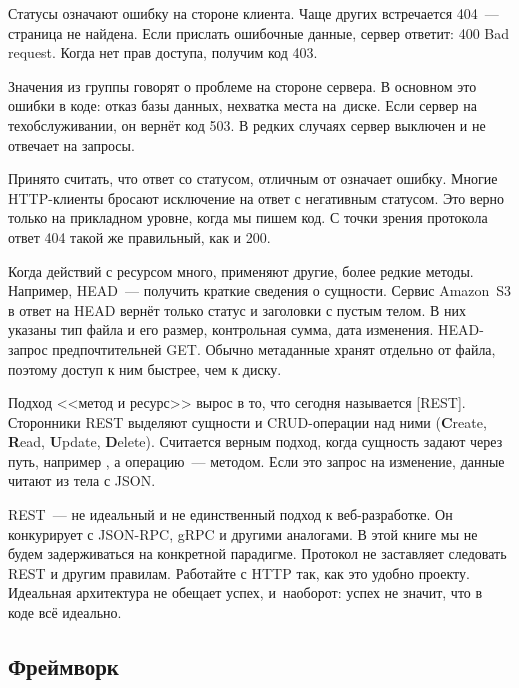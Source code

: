 Статусы  означают ошибку на стороне клиента. Чаще других встречается
404~--- страница не найдена. Если прислать ошибочные данные, сервер ответит: 400
Bad request. Когда нет прав доступа, получим код 403.

Значения из группы  говорят о проблеме на стороне сервера. В основном
это ошибки в коде: отказ базы данных, нехватка места на~диске. Если сервер на
техобслуживании, он вернёт код 503. В редких случаях сервер выключен и не
отвечает на запросы.

Принято считать, что ответ со статусом, отличным от  означает
ошибку. Многие HTTP-клиенты бросают исключение на ответ с негативным статусом.
Это верно только на прикладном уровне, когда мы пишем код. С точки зрения
протокола ответ 404 такой же правильный, как и 200.


Когда действий с ресурсом много, применяют другие, более редкие
методы. Например, HEAD~--- получить краткие сведения о сущности. Сервис
Amazon~S3 в ответ на HEAD вернёт только статус и заголовки с пустым телом. В них
указаны тип файла и его размер, контрольная сумма, дата изменения. HEAD-запрос
предпочтительней GET. Обычно метаданные хранят отдельно от файла, поэтому доступ
к ним быстрее, чем к диску.


Подход <<метод и ресурс>> вырос в то, что сегодня называется
[REST]. Сторонники REST выделяют сущности и
CRUD-операции над ними (\textbf{C}reate, \textbf{R}ead, \textbf{U}pdate,
\textbf{D}elete). Считается верным подход, когда сущность задают через путь,
например , а операцию~--- методом. Если это запрос на
изменение, данные читают из тела с JSON.

REST~--- не идеальный и не единственный подход к веб-разработке. Он конкурирует
с JSON-RPC, gRPC и другими аналогами. В этой книге мы не будем задерживаться на
конкретной парадигме. Протокол не заставляет следовать REST и другим
правилам. Работайте с HTTP так, как это удобно проекту. Идеальная архитектура не
обещает успех, и~наоборот: успех не значит, что в коде всё идеально.

\subsection{Фреймворк}


